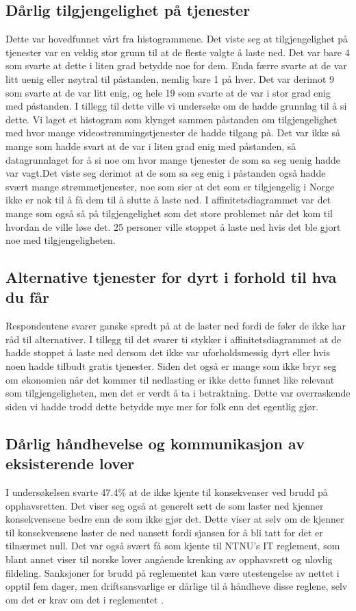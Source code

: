 \subsection{Dårlig tilgjengelighet på tjenester}
Dette var hovedfunnet vårt fra histogrammene. Det viste seg at tilgjengelighet på tjenester var en veldig stor grunn til at de fleste valgte å laste ned. Det var bare 4 som svarte at dette i liten grad betydde noe for dem. Enda færre svarte at de var litt uenig eller nøytral til påstanden, nemlig bare 1 på hver. Det var derimot 9 som svarte at de var litt enig, og hele 19 som svarte at de var i stor grad enig med påstanden. 
I tillegg til dette ville vi undersøke om de hadde grunnlag til å si dette. Vi laget et histogram som klynget sammen påstanden om tilgjengelighet med hvor mange videostrømmingstjenester de hadde tilgang på. Det var ikke så mange som hadde svart at de var i liten grad enig med påstanden, så datagrunnlaget for å si noe om hvor mange tjenester de som sa seg uenig hadde var vagt.Det viste seg derimot at de som sa seg enig i påstanden også hadde svært mange strømmetjenester, noe som sier at det som er tilgjengelig i Norge ikke er nok til å få dem til å slutte å laste ned. 
I affinitetsdiagrammet var det mange som også så på tilgjengelighet som det store problemet når det kom til hvordan de ville løse det. 25 personer ville stoppet å laste ned hvis det ble gjort noe med tilgjengeligheten. 

\subsection{Alternative tjenester for dyrt i forhold til hva du får}
Respondentene svarer ganske spredt på at de laster ned fordi de føler de ikke har råd til alternativer. I tillegg til det svarer ti stykker i affinitetsdiagrammet at de hadde stoppet å laste ned dersom det ikke var uforholdsmessig dyrt eller hvis noen hadde tilbudt gratis tjenester. Siden det også er mange som ikke bryr seg om økonomien når det kommer til nedlasting er ikke dette funnet like relevant som tilgjengeligheten, men det er verdt å ta i betraktning. Dette var overraskende siden vi hadde trodd dette betydde mye mer for folk enn det egentlig gjør. 

\subsection{Dårlig håndhevelse og kommunikasjon av eksisterende lover}
I undersøkelsen svarte 47.4\% at de ikke kjente til konsekvenser ved brudd på opphavsretten. Det viser seg også at generelt sett de som laster ned kjenner konsekvensene bedre enn de som ikke gjør det. Dette viser at selv om de kjenner til konsekvensene laster de ned uansett fordi sjansen for å bli tatt for det er tilnærmet null. Det var også svært få som kjente til NTNU's IT reglement, som blant annet viser til norske lover angående krenking av opphavsrett og ulovlig fildeling. Sanksjoner for brudd på reglementet kan være utestengelse av nettet i opptil fem dager, men driftsansvarlige er dårlige til å håndheve disse reglene, selv om det er krav om det i reglementet \cite{ITReg}. 